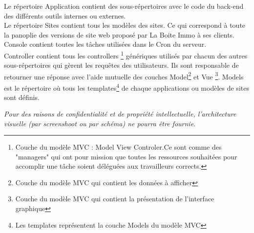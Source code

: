 \documentclass[12pt]{article}
\begin{document}
Le répertoire Application contient des sous-répertoires avec le code du back-end des différents outils internes ou externes.\\
Le répertoire Sites contient tous les modèles des sites. Ce qui correspond à toute la panoplie des versions de site web proposé par La Boite Immo à ses clients.\\
Console contient toutes les tâches utilisées dans le Cron du serveur.\\
Controller contient tous les controllers \footnote{Couche du modèle MVC : Model View Controler.Ce sont comme des "managers" qui ont pour mission que toutes les ressources souhaitées pour accomplir une tâche soient déléguées aux travailleurs corrects.} 
génériques utilisés par chacun des autres sous-répertoires qui gèrent les requêtes des utilisateurs. Ils sont responsable de retourner une réponse avec l’aide mutuelle des couches Model\footnote{Couche du modèle MVC qui contient les données à afficher} et Vue \footnote{Couche du modèle MVC qui contient la présentation de l'interface graphique}.
Models est le répertoire où tous les templates\footnote{Les templates représentent la couche Models du modèle MVC} de chaque applications ou modèles de sites sont définis.

\textit{Pour des raisons de confidentialité et de propriété intellectuelle, l'architecture visuelle (par screenshoot ou par schéma) ne pourra être fournie.}

\newpage
\end{document}
